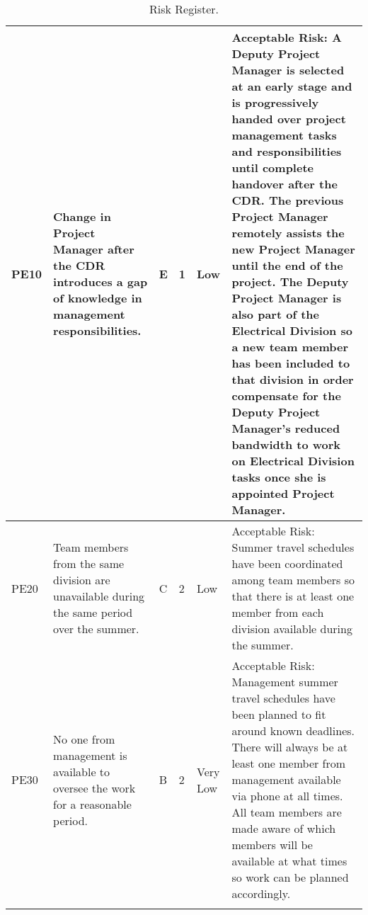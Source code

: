 \begin{longtable}{|m{}| m{} |m{} |m{}|m{}| m{}|}
PE10 & Change in Project Manager after the CDR introduces a gap of knowledge in management responsibilities. & E & 1 & \cellcolor[HTML]{FCFF2F}Low & Acceptable Risk: A Deputy Project Manager is selected at an early stage and is progressively handed over project management tasks and responsibilities until complete handover after the CDR. The previous Project Manager remotely assists the new Project Manager until the end of the project. The Deputy Project Manager is also part of the Electrical Division so a new team member has been included to that division in order compensate for the Deputy Project Manager's reduced bandwidth to work on Electrical Division tasks once she is appointed Project Manager.\\ \hline 
PE20 & Team members from the same division are unavailable during the same period over the summer. & C & 2 & \cellcolor[HTML]{FCFF2F}Low & Acceptable Risk: Summer travel schedules have been coordinated among team members so that there is at least one member from each division available during the summer. \\ \hline
PE30 & No one from management is available to oversee the work for a reasonable period. & B & 2 & \cellcolor[HTML]{34FF34}Very Low & Acceptable Risk: Management summer travel schedules have been planned to fit around known deadlines. There will always be at least one member from management available via phone at all times. All team members are made aware of which members will be available at what times so work can be planned accordingly. \\ \hline

\caption{Risk Register.}
\label{tab:risk-register}
\end{longtable}
\raggedbottom